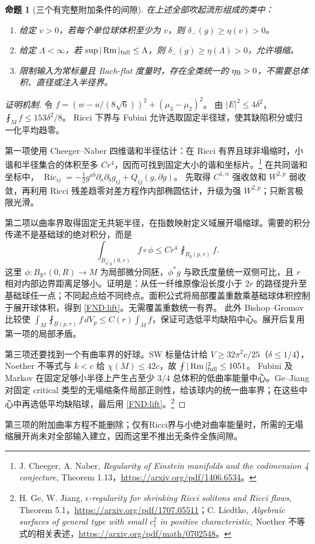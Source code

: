 \documentclass[UTF8,fontset=fandol,zihao=-4,oneside,openany]{ctexbook}
\theoremstyle{cjkplain}
\newtheorem{proposition}[theorem]{命题}
\numberwithin{equation}{chapter}
\DeclareMathOperator{\Ric}{Ric}
\DeclareMathOperator{\Rm}{Rm}
\begin{document}
\begin{proposition}[三个有完整附加条件的间隙]\label{FND:restrictedgaps}
在上述全部吹起流形组成的类中：
\begin{enumerate}
\item 给定 \(v>0\)，若每个单位球体积至少为 \(v\)，则
\(\delta_-(g)\ge\eta(v)>0\)。
\item 给定 \(\Lambda<\infty\)，若
\(\sup|\Rm|_{\rm full}\le\Lambda\)，则
\(\delta_-(g)\ge\eta(\Lambda)>0\)，允许塌缩。
\item 限制输入为常标量且 Bach-flat 度量时，存在全类统一的
\(\eta_{\rm B}>0\)，不需要总体积、直径或注入半径界。
\end{enumerate}
\end{proposition}
\begin{proof}[证明机制]
令
\(f=(w-u/(8\sqrt6))^2+(\mu_3-\mu_2)^2\)。
由 \(|E|^2\le4\delta^2\)，
\(\fint_Mf\le153\delta^2/8\)。
Ricci 下界与 Fubini 允许选取固定半径球，使其缺陷积分或归一化平均趋零。

第一项使用 Cheeger--Naber 四维谐和半径估计：在 Ricci 有界且球非塌缩时，小谐和半径集合的体积至多 \(Cr^4\)，因而可找到固定大小的谐和坐标片。\footnote{J. Cheeger, A. Naber, \emph{Regularity of Einstein manifolds and the codimension 4 conjecture}, Theorem 1.13，\url{https://arxiv.org/pdf/1406.6534}。}
在共同谐和坐标中，
\(\Ric_{ij}=-\frac12g^{ab}\partial_a\partial_bg_{ij}+Q_{ij}(g,\partial g)\)。
先取得 \(C^{1,\alpha}\) 强收敛和 \(W^{2,p}\) 弱收敛，再利用 Ricci 残差趋零对差方程作内部椭圆估计，升级为强 \(W^{2,p}\)；只断言极限光滑。

第二项以曲率界取得固定无共轭半径，在指数映射定义域展开塌缩球。需要的积分传递不是基础球的绝对积分，而是
\begin{equation}\label{FND:lift}
\int_{B_{\phi^*g}(0,r)}f\circ\phi
\le Cr^4\,\fint_{B_g(p,r)}f .
\end{equation}
这里 \(\phi:B_{\mathbb R^4}(0,R)\to M\) 为局部微分同胚，\(\phi^*g\) 与欧氏度量统一双侧可比，且 \(r\) 相对内部边界距离足够小。证明是：从任一纤维原像沿长度小于 \(2r\) 的路径提升至基础球任一点；不同起点给不同终点。面积公式将局部覆盖重数乘基础球体积控制于展开球体积，得到 \eqref{FND:lift}。无需覆盖重数统一有界。
此外 Bishop--Gromov 比较使
\(\int_M\fint_{B(p,r)}f\,dV_p\le C(r)\int_Mf\)，保证可选低平均缺陷中心。展开后复用第一项的局部矛盾。

第三项还要找到一个有曲率界的好球。SW 标量估计给
\(V\ge32\pi^2c/25\)（\(\delta\le1/4\)），Noether 不等式与
\(k<c\) 给 \(\chi(M)\le42c\)，故
\(\fint|\Rm|_{\rm full}^2\le1051\)。
Fubini 及 Markov 在固定足够小半径上产生占至少 \(3/4\) 总体积的低曲率能量中心。Ge--Jiang 对固定 critical 类型的无塌缩条件局部正则性，给该球内的统一曲率界；在这些中心中再选低平均缺陷球，最后用 \eqref{FND:lift}。\footnote{H. Ge, W. Jiang, \emph{\(\epsilon\)-regularity for shrinking Ricci solitons and Ricci flows}, Theorem 5.1，\url{https://arxiv.org/pdf/1707.05511}；C. Liedtke, \emph{Algebraic surfaces of general type with small \(c_1^2\) in positive characteristic}, Noether 不等式的相关表述，\url{https://arxiv.org/pdf/math/0702548}。}
\end{proof}
第三项的附加曲率方程不能删除；仅有Ricci界与小绝对曲率能量时，所需的无塌缩展开尚未对全部输入建立，因而这里不推出无条件全族间隙。
\end{document}
